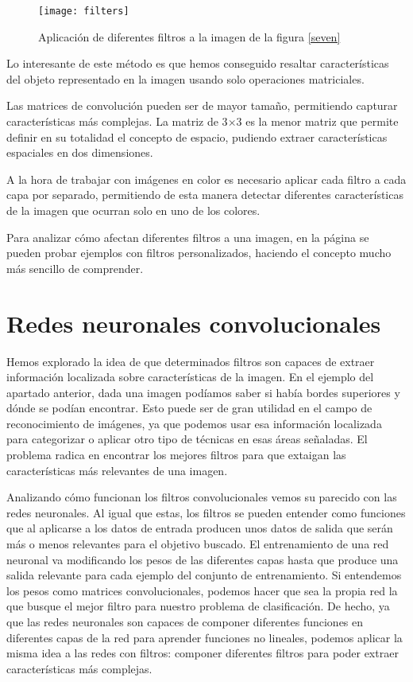 \begin{figure}
    \centering
    \caption{Aplicación de diferentes filtros a la imagen de la figura \ref{seven}}
  \label{filters}
  \texttt{[image: filters]}
\end{figure}

Lo interesante de este método es que hemos conseguido resaltar características
del objeto representado en la imagen usando solo operaciones matriciales.

Las matrices de convolución pueden ser de mayor tamaño, permitiendo capturar características más complejas. La matriz de 3$\times$3 es la menor matriz que permite definir en su totalidad el concepto de espacio, pudiendo extraer características espaciales en dos dimensiones.

A la hora de trabajar con imágenes en color es necesario aplicar cada filtro a
cada capa por separado, permitiendo de esta manera detectar diferentes
características de la imagen que ocurran solo en uno de los colores.

Para analizar cómo afectan diferentes filtros a una imagen, en la página \parencite{visualizer_convolution} se pueden probar ejemplos con filtros personalizados, haciendo el concepto mucho más sencillo de comprender.

\section{Redes neuronales convolucionales}
\label{sec:conv-net}

Hemos explorado la idea de que determinados filtros son capaces de extraer información localizada sobre características de la imagen. En el ejemplo del apartado anterior, dada una imagen podíamos saber si había bordes superiores y dónde se podían encontrar. Esto puede ser de gran utilidad en el campo de reconocimiento de imágenes, ya que podemos usar esa información localizada para categorizar o aplicar otro tipo de técnicas en esas áreas señaladas. El problema radica en encontrar los mejores filtros para que extaigan las características más relevantes de una imagen.

Analizando cómo funcionan los filtros convolucionales vemos su parecido con las redes neuronales. Al igual que estas, los filtros se pueden entender como funciones que al aplicarse a los datos de entrada producen unos datos de salida que serán más o menos relevantes para el objetivo buscado. El entrenamiento de una red neuronal va modificando los pesos de las diferentes capas hasta que produce una salida relevante para cada ejemplo del conjunto de entrenamiento. Si entendemos los pesos como matrices convolucionales, podemos hacer que sea la propia red la que busque el mejor filtro para nuestro problema de clasificación. De hecho, ya que las redes neuronales son capaces de componer diferentes funciones en diferentes capas de la red para aprender funciones no lineales, podemos aplicar la misma idea a las redes con filtros: componer diferentes filtros para poder extraer características más complejas.

